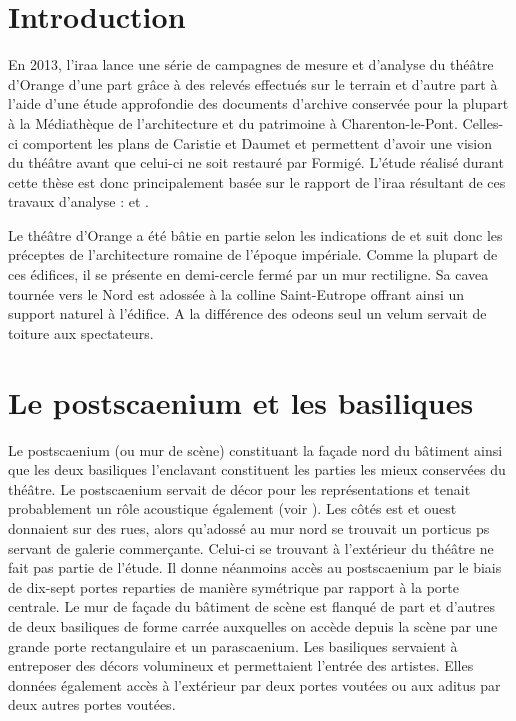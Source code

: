 		\section{Introduction}
		
		En 2013, l'\gls{iraa} lance une série de campagnes de mesure et d'analyse du théâtre d'Orange d'une part grâce à des relevés effectués sur le terrain et d'autre part à l'aide d'une étude approfondie des documents d'archive conservée pour la plupart à la Médiathèque de l'architecture et du patrimoine à Charenton-le-Pont. Celles-ci comportent les plans de Caristie et Daumet et permettent d'avoir une vision du théâtre avant que celui-ci ne soit restauré par Formigé. L'étude réalisé durant cette thèse est donc principalement basée sur le rapport de l'\gls{iraa} résultant de ces travaux d'analyse : \cite{orangeTxt} et \citep{orangePl}.
		
		Le théâtre d'Orange a été bâtie en partie selon les indications de \cite{vitruve} et suit donc les préceptes de l'architecture romaine de l'époque impériale. Comme la plupart de ces édifices, il se présente en demi-cercle fermé par un mur rectiligne. Sa \gls{cavea} tournée vers le Nord est adossée à la colline Saint-Eutrope offrant ainsi un support naturel à l'édifice. A la différence des \glspl{odeon} seul un \gls{velum} servait de toiture aux spectateurs.

		\section{Le \gls{postscaenium} et les \glspl{basilique} }
		
		Le \gls{postscaenium} (ou mur de scène) constituant la façade nord du bâtiment ainsi que les deux \glspl{basilique} l'enclavant constituent les parties les mieux conservées du théâtre. Le \gls{postscaenium} servait de décor pour les représentations et tenait probablement un rôle acoustique également (voir ). Les côtés est et ouest donnaient sur des rues, alors qu'adossé au mur nord se trouvait un \gls{porticus ps} servant de galerie commerçante. Celui-ci se trouvant à l'extérieur du théâtre ne fait pas partie de l'étude. Il donne néanmoins accès au \gls{postscaenium} par le biais de dix-sept portes reparties de manière symétrique par rapport à la porte centrale. Le mur de façade du bâtiment de scène est flanqué de part et d'autres de deux \glspl{basilique} de forme carrée auxquelles on accède depuis la scène par une grande porte rectangulaire et un \gls{parascaenium}. Les \glspl{basilique} servaient à entreposer des décors volumineux et permettaient l'entrée des artistes. Elles données également accès à l'extérieur par deux portes voutées ou aux \gls{aditus} par deux autres portes voutées.
		
